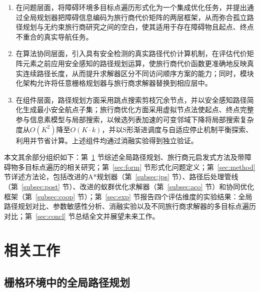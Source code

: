 \documentclass[lettersize,journal]{IEEEtran}
\begin{document}
\begin{enumerate}

\item 在问题层面，将障碍环境多目标点遍历形式化为一个集成优化任务，并提出通过全局规划器把障碍信息编码为旅行商代价矩阵的两层框架，从而弥合孤立路径规划与无约束旅行商研究之间的空白，使其适用于存在障碍物且起点、终点不重合的真实导航任务。

\item 在算法协同层面，引入具有安全检测的真实路径代价计算机制，在评估代价矩阵元素之前应用安全感知的路径规划运算，使旅行商代价函数更准确地反映真实连续路径长度，从而提升求解器区分不同访问顺序方案的能力；同时，模块化架构允许将任意栅格规划器与旅行商求解器替换到相应层中。

\item 在组件层面，路径规划方面采用跳点搜索剪枝冗余节点，并以安全感知路径简化生成最小安全航点子集；旅行商优化方面采用虚拟节点法使起点、终点完整参与信息素模型与局部搜索，以候选列表加速的可变邻域下降将局部搜索复杂度从$O(K^2)$降至$O(K \cdot k)$，并以S形渐进调度与自适应停止机制平衡探索、利用并节省计算。上述组件均通过消融实验得到独立验证。

\end{enumerate}

本文其余部分组织如下：第~\textcolor{blue}{\ref{sec:related}} 节综述全局路径规划、旅行商元启发式方法及带障碍物多目标点遍历的相关研究；第~\textcolor{blue}{\ref{sec:form}} 节形式化问题定义；第~\textcolor{blue}{\ref{sec:method}} 节详述方法论，包括改进的A*规划器（第~\textcolor{blue}{\ref{subsec:jps}} 节）、路径后处理管线（第~\textcolor{blue}{\ref{subsec:post}} 节）、改进的蚁群优化求解器（第~\textcolor{blue}{\ref{subsec:aco}} 节）和协同优化框架（第~\textcolor{blue}{\ref{subsec:coop}} 节）；第~\textcolor{blue}{\ref{sec:exp}} 节报告四个评估维度的实验结果：全局路径规划对比、参数敏感性分析、消融实验以及不同旅行商求解器的多目标点遍历对比；第~\textcolor{blue}{\ref{sec:concl}} 节总结全文并展望未来工作。

\section{相关工作}

\label{sec:related}

\subsection{栅格环境中的全局路径规划}
\end{document}
